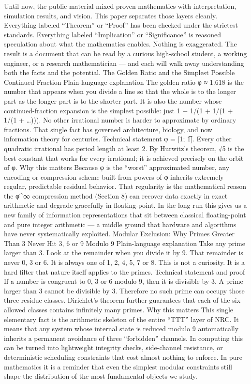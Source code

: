 {{{{{{Until now, the public material mixed proven mathematics with interpretation, simulation results, and vision. This paper separates those layers cleanly.
Everything labeled “Theorem” or “Proof” has been checked under the strictest standards.
Everything labeled “Implication” or “Significance” is reasoned speculation about what the mathematics enables.
Nothing is exaggerated.
The result is a document that can be read by a curious high-school student, a working engineer, or a research mathematician — and each will walk away understanding both the facts and the potential.
The Golden Ratio and the Simplest Possible Continued Fraction
Plain-language explanation
The golden ratio φ ≈ 1.618 is the number that appears when you divide a line so that the whole is to the longer part as the longer part is to the shorter part. It is also the number whose continued-fraction expansion is the simplest possible: just 1 + 1/(1 + 1/(1 + 1/(1 + …))).
No other irrational number is harder to approximate by ordinary fractions. That single fact has governed architecture, biology, and now information theory for centuries.
Technical statement
φ = [1; 1̅]. Every other quadratic irrational has period length at least 2.
By Hurwitz’s theorem, √5 is the best constant that works for every irrational; it is achieved precisely on the orbit of φ.
Why this matters
Because φ is the “worst” approximated number, any encoding or compression scheme built from powers of φ inherits extremely regular, predictable residual behavior. That regularity is the mathematical reason the φ^∞ compression method (Section 8) can recover data exactly in exact arithmetic and degrade gracefully in floating-point. In the long run this gives us a new family of information representations that sit between classical floating-point and pure integer arithmetic — a middle ground that hardware and algorithms have never systematically exploited.
Modular Exclusion: Why Primes Greater Than 3 Never Hit 3, 6 or 9 Modulo 9
Plain-language explanation
Take any prime larger than 3. Look at the remainder when you divide it by 9. That remainder is never 0, 3 or 6. It is always one of 1, 2, 4, 5, 7 or 8.
This is not a curiosity. It is a hard filter that nature itself applies to the primes.
Technical statement and proof
If a number is congruent to 0, 3 or 6 modulo 9, then it is divisible by 3. A prime larger than 3 cannot be divisible by 3. Therefore no such prime can occupy those three residue classes.
Dirichlet’s theorem further guarantees that each of the six allowed classes contains infinitely many primes.
Why this matters
This single elementary fact is the arithmetic skeleton of the entire “TTT” layer of NRC. It means that any system whose internal state is reduced modulo 9 automatically inherits a permanent avoidance of three “forbidden” channels. In computing this can be turned into lightweight integrity checks, side-channel resistance, or deterministic scheduling constraints that cost almost nothing to enforce. In pure mathematics it is a reminder that even the simplest modular constraints still shape the distribution of the most fundamental objects we study.
}}}}}}
